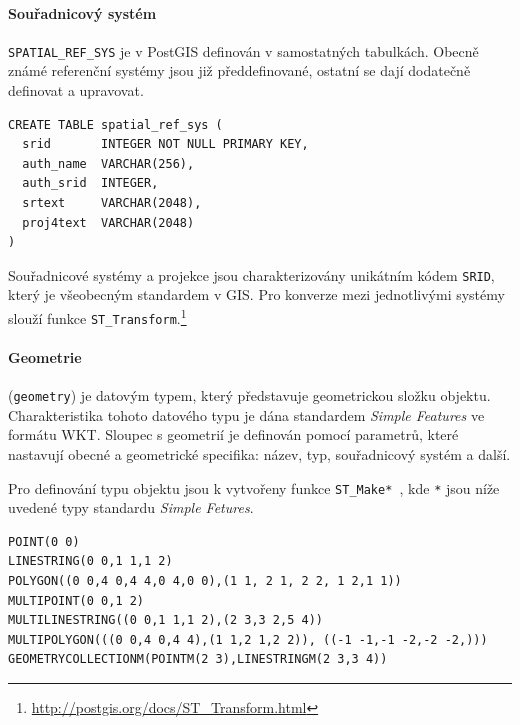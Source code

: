 \documentclass[a4paper,12pt,oneside]{report}
\begin{document}
\paragraph*{Souřadnicový systém} \texttt{SPATIAL\_REF\_SYS} je v PostGIS  definován v samostatných tabulkách. Obecně známé referenční systémy jsou již předdefinované, ostatní se dají dodatečně definovat a upravovat.

\begin{verbatim}
CREATE TABLE spatial_ref_sys (
  srid       INTEGER NOT NULL PRIMARY KEY,
  auth_name  VARCHAR(256),
  auth_srid  INTEGER,
  srtext     VARCHAR(2048),
  proj4text  VARCHAR(2048)
)
\end{verbatim}

Souřadnicové systémy a projekce jsou charakterizovány unikátním kódem \texttt{\acs{SRID}}, který je všeobecným standardem v GIS. Pro konverze mezi jednotlivými systémy slouží funkce \texttt{ST\_Transform}.\footnote{\url{http://postgis.org/docs/ST_Transform.html}}


\paragraph*{Geometrie} (\texttt{geometry}) je datovým typem, který představuje geometrickou složku objektu.  Charakteristika tohoto datového typu je dána standardem \textit{Simple Features} ve formátu \acs{WKT}.
Sloupec s geometrií je definován pomocí parametrů, které nastavují obecné a geometrické  specifika: název, typ, souřadnicový systém a další.

Pro definování typu objektu jsou k vytvořeny funkce \texttt{ST\_Make* }, kde \texttt{*} jsou níže uvedené typy standardu \textit{Simple Fetures}. 


\begin{verbatim}
POINT(0 0)                                               
LINESTRING(0 0,1 1,1 2)                                       
POLYGON((0 0,4 0,4 4,0 4,0 0),(1 1, 2 1, 2 2, 1 2,1 1))          
MULTIPOINT(0 0,1 2)                                              
MULTILINESTRING((0 0,1 1,1 2),(2 3,3 2,5 4))                       
MULTIPOLYGON(((0 0,4 0,4 4),(1 1,2 1,2 2)), ((-1 -1,-1 -2,-2 -2,))) 
GEOMETRYCOLLECTIONM(POINTM(2 3),LINESTRINGM(2 3,3 4))                
\end{verbatim}
\end{document}
